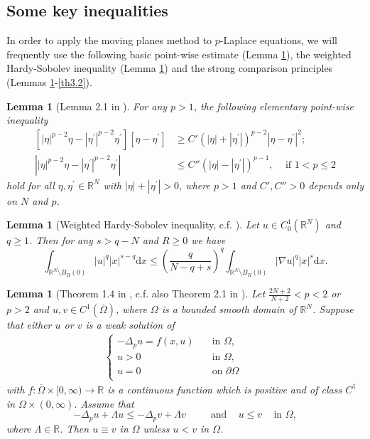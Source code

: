 \documentclass[12pt]{amsart}
\newtheorem{lem}[thm]{Lemma}
\theoremstyle{definition}
\theoremstyle{remark}
\theoremstyle{conclusion}
\theoremstyle{conjecture}
\numberwithin{equation}{section}
\newcommand{\R}{\mathbb{R}}
\begin{document}
\subsection{Some key inequalities}\label{sc2.1}


\medskip

In order to apply the moving planes method to $p$-Laplace equations, we will frequently use the following basic point-wise estimate (Lemma \ref{BSICI}), the weighted Hardy-Sobolev inequality (Lemma \ref{HDSI}) and the strong comparison principles (Lemmas \ref{th3.1}-\ref{th3.2}).
\begin{lem}[Lemma 2.1 in \cite{LD}] \label{BSICI}
For any $ p>1 $, the following elementary point-wise inequality
\begin{align}\label{eq0802}
[|\eta|^{p-2}\eta-|\eta^\prime|^{p-2}\eta^\prime][\eta-\eta^\prime] &\geq C' (|\eta|+|\eta^\prime|)^{p-2}|\eta-\eta^\prime|^2; \\
\left| |\eta|^{p-2}\eta-|\eta^\prime|^{p-2}\eta^\prime \right| &\leq C'' (|\eta|-|\eta^\prime|)^{p-1},\,\,\,\,\,\,\,\mbox{if}\,\, 1<p\leq 2 \nonumber
\end{align}
hold for all $\eta,\eta^\prime \in \R^N$ with $|\eta|+|\eta^\prime|>0$, where $p>1$ and $C', C''>0$ depends only on $N$ and $p$.
\end{lem}


\begin{lem}[Weighted Hardy-Sobolev inequality, c.f. \cite{LDMR}]\label{HDSI}
Let $ u \in C_0^1(\R^N)$ and $q\geq 1$. Then for any $ s > q-N $ and $ R\geq 0 $ we have
$$ \int_{\R^N\setminus B_R(0)} |u|^q |x|^{s-q} \mathrm{d}x \leq \left( \frac{q}{N-q+s} \right)^q \int_{\R^N\setminus B_R(0)} |\nabla u|^q |x|^s \mathrm{d}x.$$
\end{lem}

\begin{lem}[Theorem 1.4 in \cite{LDBS}, c.f. also Theorem 2.1 in \cite{OSV}]\label{th3.1}
Let $\frac{2N+2}{N+2}<p<2$ or $p>2$ and $u,v \in C^1(\overline{\Omega})$, where $\Omega$ is a bounded smooth domain of $\R^N$. Suppose that either $u$ or $v$ is a weak solution of
\begin{align*}
\left\{ \begin{array}{ll}
-\Delta_p u =f(x,u) \,\,\,\,\,\, & \mbox{in}\,\,\Omega, \\
u>0 \,\,\,\,\,\,& \mbox{in}\,\,\Omega, \\
u=0 \,\,\,\,\,\,& \mbox{on}\,\,\partial\Omega \\
\end{array}
\right.\hspace{1cm}
\end{align*}
with $f:\overline{\Omega}\times [0,\infty)\to \R$ is a continuous function which is positive and of class $C^1$ in $\Omega\times(0,\infty)$. Assume that
$$ -\Delta_p u + \Lambda u \leq  -\Delta_p v + \Lambda v \qquad \,\,\,\mbox{and} \quad \,u\leq v\,\quad\mbox{in}\,\,\Omega,$$
where $\Lambda\in\R$. Then $u\equiv v$ in $\Omega$ unless $u<v$ in $\Omega$.
\end{lem}
\end{document}
